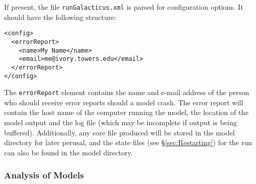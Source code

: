If present, the file {\tt runGalacticus.xml} is parsed for configuration options. It should have the following structure:
\begin{verbatim}
<config>
  <errorReport>
    <name>My Name</name>
    <email>me@ivory.towers.edu</email>
  </errorReport>
</config>
\end{verbatim}
The {\tt errorReport} element contains the name and e-mail address of the person who should receive error reports should a model crash. The error report will contain the host name of the computer running the model, the location of the model output and the log file (which may be incomplete if output is being buffered). Additionally, any core file produced will be stored in the model directory for later perusal, and the state files (see \S\ref{sec:Restarting}) for the run can also be found in the model directory.

\subsubsection{Analysis of Models}

